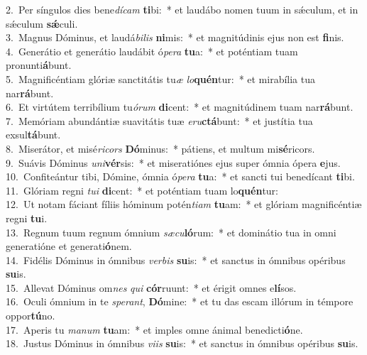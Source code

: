 {2.~}Per síngulos dies bene\textit{dí}\textit{cam} \textbf{ti}bi:~* et laudábo nomen tuum in sǽculum, et in sǽculum \textbf{sǽ}culi.\\
{3.~}Magnus Dóminus, et laudá\textit{bi}\textit{lis} \textbf{ni}mis:~* et magnitúdinis ejus non est \textbf{fi}nis.\\
{4.~}Generátio et generátio laudábit ó\textit{pe}\textit{ra} \textbf{tu}a:~* et poténtiam tuam pronunti\textbf{á}bunt.\\
{5.~}Magnificéntiam glóriæ sanctitátis tu\textit{æ} \textit{lo}\textbf{quén}tur:~* et mirabília tua nar\textbf{rá}bunt.\\
{6.~}Et virtútem terribílium tu\textit{ó}\textit{rum} \textbf{di}cent:~* et magnitúdinem tuam nar\textbf{rá}bunt.\\
{7.~}Memóriam abundántiæ suavitátis tuæ \textit{e}\textit{ru}\textbf{ctá}bunt:~* et justítia tua exsul\textbf{tá}bunt.\\
{8.~}Miserátor, et misé\textit{ri}\textit{cors} \textbf{Dó}minus:~* pátiens, et multum mi\textbf{sé}ricors.\\
{9.~}Suávis Dóminus \textit{u}\textit{ni}\textbf{vér}sis:~* et miseratiónes ejus super ómnia ópera \textbf{e}jus.\\
{10.~}Confiteántur tibi, Dómine, ómnia ó\textit{pe}\textit{ra} \textbf{tu}a:~* et sancti tui benedícant \textbf{ti}bi.\\
{11.~}Glóriam regni \textit{tu}\textit{i} \textbf{di}cent:~* et poténtiam tuam lo\textbf{quén}tur:\\
{12.~}Ut notam fáciant fíliis hóminum potén\textit{ti}\textit{am} \textbf{tu}am:~* et glóriam magnificéntiæ regni \textbf{tu}i.\\
{13.~}Regnum tuum regnum ómnium \textit{sæ}\textit{cu}\textbf{ló}rum:~* et dominátio tua in omni generatióne et generati\textbf{ó}nem.\\
{14.~}Fidélis Dóminus in ómnibus \textit{ver}\textit{bis} \textbf{su}is:~* et sanctus in ómnibus opéribus \textbf{su}is.\\
{15.~}Allevat Dóminus om\textit{nes} \textit{qui} \textbf{cór}ruunt:~* et érigit omnes e\textbf{lí}sos.\\
{16.~}Oculi ómnium in te \textit{spe}\textit{rant}, \textbf{Dó}mine:~* et tu das escam illórum in témpore oppor\textbf{tú}no.\\
{17.~}Aperis tu \textit{ma}\textit{num} \textbf{tu}am:~* et imples omne ánimal benedicti\textbf{ó}ne.\\
{18.~}Justus Dóminus in ómnibus \textit{vi}\textit{is} \textbf{su}is:~* et sanctus in ómnibus opéribus \textbf{su}is.\\

